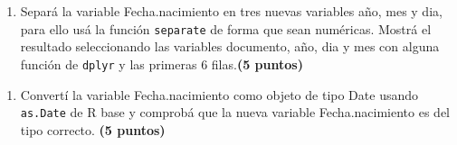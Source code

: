 \documentclass[
]{article}
\newenvironment{Shaded}{\begin{snugshade}}{\end{snugshade}}
\newcommand{\DataTypeTok}[1]{\textcolor[rgb]{0.13,0.29,0.53}{#1}}
\newcommand{\KeywordTok}[1]{\textcolor[rgb]{0.13,0.29,0.53}{\textbf{#1}}}
\newcommand{\NormalTok}[1]{#1}
\newcommand{\OperatorTok}[1]{\textcolor[rgb]{0.81,0.36,0.00}{\textbf{#1}}}
\newcommand{\StringTok}[1]{\textcolor[rgb]{0.31,0.60,0.02}{#1}}
\providecommand{\tightlist}{%
  \setlength{\itemsep}{0pt}\setlength{\parskip}{0pt}}
\begin{document}
\begin{Shaded}
\end{Shaded}

\begin{enumerate}
\def\labelenumi{\arabic{enumi}.}
\setcounter{enumi}{7}
\tightlist
\item
  Separá la variable Fecha.nacimiento en tres nuevas variables año, mes
  y dia, para ello usá la función \texttt{separate} de forma que sean
  numéricas. Mostrá el resultado seleccionando las variables documento,
  año, dia y mes con alguna función de \texttt{dplyr} y las primeras 6
  filas.\textbf{(5 puntos)}
\end{enumerate}

\begin{Shaded}
\end{Shaded}

\begin{enumerate}
\def\labelenumi{\arabic{enumi}.}
\setcounter{enumi}{8}
\tightlist
\item
  Convertí la variable Fecha.nacimiento como objeto de tipo Date usando
  \texttt{as.Date} de R base y comprobá que la nueva variable
  Fecha.nacimiento es del tipo correcto. \textbf{(5 puntos)}
\end{enumerate}
\end{document}
